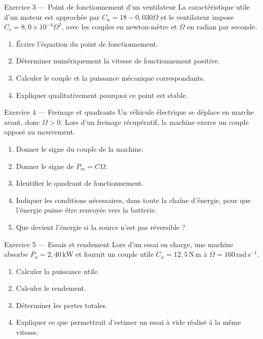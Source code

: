 \begin{TLExercise}{Exercice 3 — Point de fonctionnement d'un ventilateur}
La caractéristique utile d'un moteur est approchée par
$C_u=18-0{,}030\Omega$ et le ventilateur impose
$C_r=8{,}0\times10^{-4}\Omega^2$, avec les couples en newton-mètre et
$\Omega$ en radian par seconde.
\begin{enumerate}
  \item Écrire l'équation du point de fonctionnement.
  \item Déterminer numériquement la vitesse de fonctionnement positive.
  \item Calculer le couple et la puissance mécanique correspondants.
  \item Expliquer qualitativement pourquoi ce point est stable.
\end{enumerate}
\end{TLExercise}

\begin{TLExercise}{Exercice 4 — Freinage et quadrants}
Un véhicule électrique se déplace en marche avant, donc $\Omega>0$.
Lors d'un freinage récupératif, la machine exerce un couple opposé au mouvement.
\begin{enumerate}
  \item Donner le signe du couple de la machine.
  \item Donner le signe de $P_m=C\Omega$.
  \item Identifier le quadrant de fonctionnement.
  \item Indiquer les conditions nécessaires, dans toute la chaîne d'énergie, pour que
  l'énergie puisse être renvoyée vers la batterie.
  \item Que devient l'énergie si la source n'est pas réversible ?
\end{enumerate}
\end{TLExercise}

\begin{TLExercise}{Exercice 5 — Essais et rendement}
Lors d'un essai en charge, une machine absorbe $P_a=2{,}40\,\mathrm{kW}$ et fournit
un couple utile $C_u=12{,}5\,\mathrm{N\,m}$ à
$\Omega=160\,\mathrm{rad\,s^{-1}}$.
\begin{enumerate}
  \item Calculer la puissance utile.
  \item Calculer le rendement.
  \item Déterminer les pertes totales.
  \item Expliquer ce que permettrait d'estimer un essai à vide réalisé à la même vitesse.
\end{enumerate}
\end{TLExercise}

